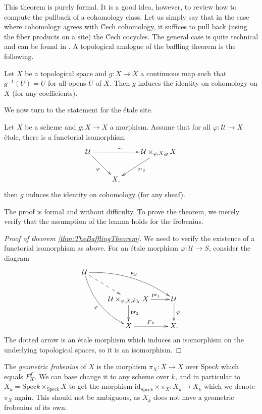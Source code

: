 This theorem is purely formal. It is a good idea, however, to review how to compute the pullback of a cohomology class. Let us simply say that in the case where cohomology agrees with \u Cech cohomology, it suffices to pull back (using the fiber products on a site) the \u Cech cocycles. The general case is quite technical and can be found in \cite[somewhere]{Stacks}. A topological analogue of the baffling theorem is the following.

\begin{exercise}
Let $X$ be a topological space and $g : X \to X$ a continuous map such that $g^{-1}(U) = U$ for all opens $U$ of $X$. Then $g$ induces the identity on cohomology on $X$ (for any coefficients).
\end{exercise}

We now turn to the statement for the \'etale site.

\begin{lemma} \label{lem:FormalStuffForBafflingThm}
Let $X$ be a scheme and $g : X \to X$ a morphism. Assume that for all $\varphi: \mathcal{U} \to X$ \'etale, there is a functorial isomorphism 
$$
\xymatrix{
\mathcal{U} \ar_{\varphi}[rd] \ar^{\sim \quad}[rr] &&  {\mathcal{U} \times_{\varphi, X,g} X} \ar^{\text{pr}_2}[ld]\\
& X,
}
$$
then $g$ induces the identity on cohomology (for any sheaf). 
\end{lemma}

The proof is formal and without difficulty. To prove the theorem, we merely verify that the assumption of the lemma holds for the frobenius.

\begin{proof}[Proof of theorem \ref{thm:TheBafflingTheorem}]
We need to verify the existence of a functorial isomorphism as above. For an \'etale morphism $\varphi: \mathcal{U} \to S$, consider the diagram
$$
\xymatrix{
\mathcal{U} \ar@{-->}[rd] \ar^{F_\mathcal{U}}@/^1pc/[rrd] \ar_{\varphi}@/_1pc/[rdd] \\
& {\mathcal{U} \times_{\varphi, X,F_X} X} \ar^{\qquad \text{pr}_1 \ \ }[r] \ar^{\text{pr}_2}[d] & \mathcal{U} \ar^{\varphi}[d] \\
& X \ar^{F_X}[r] & X.
}
$$
The dotted arrow is an \'etale morphism which induces an isomorphism on the underlying topological spaces, so it is an isomorphism.
\end{proof}


\begin{definition}
The \emph{geometric frobenius} of $X$ is the morphism $\pi_X : X \to X$ over $\text{Spec} k$ which equals $F_X^f$. We can base change it to any scheme over $k$, and in particular to $X_{\bar k} = \text{Spec}  \bar k \times_{\text{Spec} k} X$ to get the morphism $\text{id}_{\text{Spec} \bar k } \times \pi_X : X_{\bar k} \to X_{\bar k}$ which we denote $\pi_X$ again. This should not be ambiguous, as $X_{\bar k}$ does not have a geometric frobenius of its own.
\end{definition}

